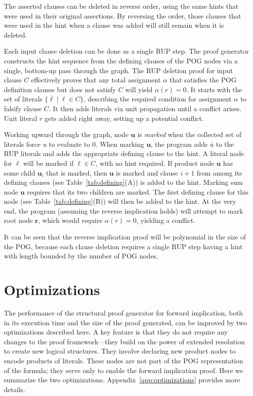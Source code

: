 \documentclass[letterpaper,USenglish,cleveref, autoref, thm-restate]{lipics-v2021}
\newcommand{\obar}[1]{\overline{#1}}
\newcommand{\lit}{\ell}
\newcommand{\assign}{\alpha}
\newcommand{\makenode}[1]{\mathbf{#1}}
\newcommand{\nodeu}{\makenode{u}}
\newcommand{\noder}{\makenode{r}}
\begin{document}
The asserted clauses can be deleted in reverse order, using the same
hints that were used in their original assertions.  By reversing the
order, those clauses that were used in the hint when a clause was
added will still remain when it is deleted.

Each input clause deletion can be done as a single RUP step.  The
proof generator constructs the hint sequence from the defining
clauses of the POG nodes via a single, bottom-up pass through the
graph.  The RUP deletion proof for input clause $C$ effectively proves that any
total assignment $\assign$ that satisfies the POG definition clauses
but does not satisfy $C$ will yield
$\assign(r) = 0$.  It starts with the set of literals
$\{ \obar{\lit} \mid \lit \in C\}$, describing the required condition for
assignment $\assign$ to falsify clause $C$.
It then
adds literals via unit propagation until a
conflict arises.    Unit literal $r$ gets
added right away, setting up a potential conflict.

Working upward through the graph, node $\nodeu$ is {\em marked} when
the collected set of literals force $u$ to evaluate to $0$.  When marking $\nodeu$, the
program adds $\obar{u}$ to the RUP literals and adds the appropriate
defining clause to the hint.  A literal node for
$\lit$ will be marked if $\lit \in C$, with no hint required.  If
product node $\nodeu$ has some child $\nodeu_i$ that is marked, then
$\nodeu$ is marked and clause $i+1$ from among its defining clauses (see Table~\ref{tab:defining}(A)) is
added to the hint.  Marking sum node $\nodeu$ requires that its two children are marked.
The first defining
clause for this node (see Table~\ref{tab:defining}(B)) will then be added to the hint.  At the very end, the program
(assuming the reverse implication holds) will attempt to mark root
node $\noder$, which would require $\assign(r) = 0$, yielding a
conflict.

It can be seen that the reverse implication proof will be polynomial in the size of the POG\@, because
each clause deletion requires a single RUP step having a hint with length
bounded by the number of POG nodes.

\section{Optimizations}

The performance of the structural proof generator for forward implication, both in its execution time and
the size of the proof generated, can be improved by two optimizations
described here.  A key feature is that they do not require any changes
to the proof framework---they build on the power of extended
resolution to create new logical structures.  They
involve declaring new product nodes to encode products of literals.
These nodes are not part of the POG
representation of the formula; they serve only to enable the forward
implication proof.  Here we summarize the two optimizations.
Appendix~\ref{app:optimizations} provides more details.
\end{document}

